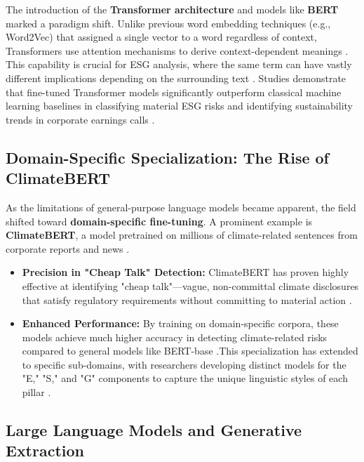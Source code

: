 \documentclass[english, online, cse, master]{dithesis}
\begin{document}
The introduction of the \textbf{Transformer architecture} and models like \textbf{BERT} marked a paradigm shift. Unlike previous word embedding techniques (e.g., Word2Vec) that assigned a single vector to a word regardless of context, Transformers use attention mechanisms to derive context-dependent meanings  \parencite{frederik_maibaum_b8629037}. This capability is crucial for ESG analysis, where the same term can have vastly different implications depending on the surrounding text  \parencite{natraj_raman_009776f2}. Studies demonstrate that fine-tuned Transformer models significantly outperform classical machine learning baselines in classifying material ESG risks and identifying sustainability trends in corporate earnings calls  \parencite[]{tae_sun_chung_e16a4c18, natraj_raman_009776f2}.
\subsection{ Domain-Specific Specialization: The Rise of ClimateBERT}

As the limitations of general-purpose language models became apparent, the field shifted toward \textbf{domain-specific fine-tuning}. A prominent example is \textbf{ClimateBERT}, a model pretrained on millions of climate-related sentences from corporate reports and news  \parencite[]{tobias_schimanski_4e192ec5, julia_bingler_268445e3}.
\begin{itemize}
\item 

\textbf{Precision in "Cheap Talk" Detection:} ClimateBERT has proven highly effective at identifying "cheap talk"—vague, non-committal climate disclosures that satisfy regulatory requirements without committing to material action  \parencite{julia_bingler_268445e3}.\item 

\textbf{Enhanced Performance:} By training on domain-specific corpora, these models achieve much higher accuracy in detecting climate-related risks compared to general models like BERT-base  \parencite[]{tae_sun_chung_e16a4c18, julia_bingler_268445e3}.This specialization has extended to specific sub-domains, with researchers developing distinct models for the "E," "S," and "G" components to capture the unique linguistic styles of each pillar  \parencite{tobias_schimanski_4e192ec5}.
\end{itemize}
\subsection{ Large Language Models and Generative Extraction}
\end{document}
